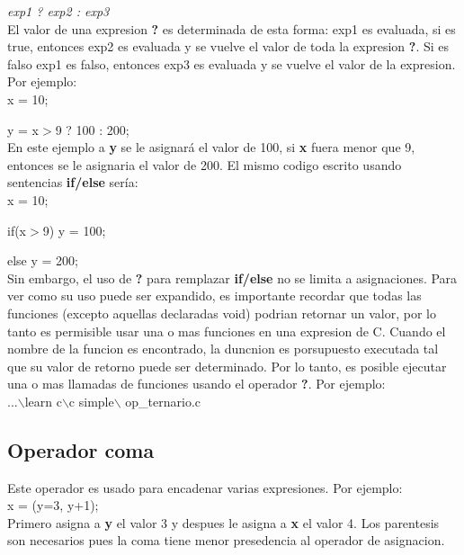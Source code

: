 \documentclass[]{article}
\begin{document}
			\textit{exp1 ? exp2 : exp3}\\
			
			El valor de una expresion \textbf{?} es determinada de esta forma: exp1 es evaluada, si es true, entonces exp2 es evaluada y se vuelve el valor de toda la expresion \textbf{?}. Si es falso exp1 es falso, entonces exp3 es evaluada y se vuelve el valor de la expresion. Por ejemplo:\\
			
			x = 10;
			
			y = x$>$9 ? 100 : 200;\\
			
			En este ejemplo a \textbf{y} se le asignará el valor de 100, si \textbf{x} fuera menor que 9, entonces se le asignaria el valor de 200. El mismo codigo escrito usando sentencias \textbf{if/else} sería:\\
			
			x = 10;
			
			if(x$>$9) y = 100;
			
			else y = 200;\\
			
			Sin embargo, el uso de \textbf{?} para remplazar \textbf{if/else} no se limita a asignaciones. Para ver como su uso puede ser expandido, es importante recordar que todas las funciones (excepto aquellas declaradas void) podrian retornar un valor, por lo tanto es permisible usar una o mas funciones en una expresion de C. Cuando el nombre de la funcion es encontrado, la duncnion es porsupuesto executada tal que su valor de retorno puede ser determinado. Por lo tanto, es posible ejecutar una o mas llamadas de funciones usando el operador \textbf{?}. Por ejemplo:\\
			
			...$\backslash$learn c$\backslash$c simple$\backslash$ op\_ternario.c\\
			
			
			\subsection{Operador coma}
			
			Este operador es usado para encadenar varias expresiones. Por ejemplo:\\
			
			x = (y=3, y+1);\\
			
			Primero asigna a \textbf{y} el valor 3 y despues le asigna a \textbf{x} el valor 4. Los parentesis son necesarios pues la coma tiene menor presedencia al operador de asignacion.
			
\end{document}
